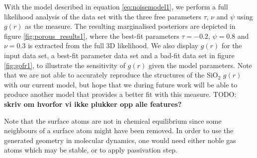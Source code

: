 \documentclass[aps,pre,twocolumn,letterpaper,floatfix,showpacs]{revtex4}
\newcommand{\todo}[1]{ {\color{Magenta} TODO: \color{Blue} \textbf{#1} }}
\begin{document}
With the model described in equation \ref{eq:noisemodel1}, we perform a full likelihood
analysis of the data set with the three free parameters $\tau$, $\nu$ and $\psi$ using $g(r)$ as the measure. 
The resulting marginalised posteriors are depicted in figure \ref{fig:porous_results1},
where the best-fit parameters $\tau=-0.2$, $\psi=0.8$ and $\nu=0.3$ is extracted from the full 3D likelihood. 
We also display $g(r)$ for the input data set, a best-fit parameter data set and a
bad-fit data set in figure \ref{fig:gofr1}, to illustrate the sensitivity of $g(r)$ given the model parameters. 
Note that we are not able to accurately reproduce the structures of the SiO$_2$ $g(r)$ with
our current model, but hope that we during future work will be able to produce another model
that provides a better fit with this measure. 
\todo{skriv om hvorfor vi ikke plukker opp alle features?}

Note that the surface atoms are not in chemical equilibrium since some neighbours of a surface atom might have been removed. 
In order to use the generated geometry in molecular dynamics, one would need either noble gas
atoms which may be stable, or to apply passivation step.
\end{document}

